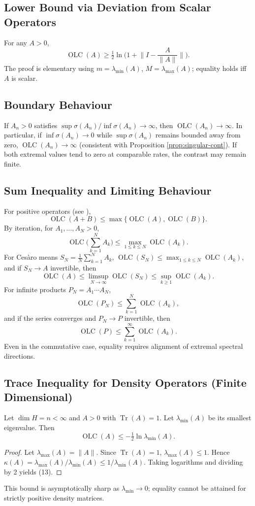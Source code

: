 \documentclass{article}
\theoremstyle{remark}
\providecommand{\QLC}{\operatorname{OLC}}
\begin{document}
\subsection{Lower Bound via Deviation from Scalar Operators}
For any $A>0$,
\[
\QLC(A) \ge \tfrac12\ln\Big(1+\Big\|I-\frac{A}{\|A\|}\Big\|\Big). \tag{7}
\]
The proof is elementary using $m=\lambda_{\min}(A)$, $M=\lambda_{\max}(A)$; equality holds iff $A$ is scalar.

\subsection{Boundary Behaviour}
If $A_n>0$ satisfies $\sup\sigma(A_n)/\inf\sigma(A_n)\to\infty$, then $\QLC(A_n)\to\infty$. In particular, if $\inf\sigma(A_n)\to0$ while $\sup\sigma(A_n)$ remains bounded away from zero, $\QLC(A_n)\to\infty$ (consistent with Proposition \ref{prop:singular-cont}). If both extremal values tend to zero at comparable rates, the contrast may remain finite.

\subsection{Sum Inequality and Limiting Behaviour}
For positive operators (see \cite{abed2024}),
\[
\QLC(A+B) \le \max\{\QLC(A),\QLC(B)\}. \tag{8}
\]
By iteration, for $A_1,\dots,A_N>0$,
\[
\QLC\Big(\sum_{k=1}^N A_k\Big) \le \max_{1\le k\le N}\QLC(A_k). \tag{9}
\]
For Ces\`aro means $S_N=\tfrac1N\sum_{k=1}^N A_k$, $\QLC(S_N)\le\max_{1\le k\le N}\QLC(A_k)$, and if $S_N\to A$ invertible, then
\[
\QLC(A) \le \limsup_{N\to\infty}\QLC(S_N) \le \sup_{k\ge1}\QLC(A_k). \tag{10}
\]
For infinite products $P_N=A_1\cdots A_N$,
\[
\QLC(P_N) \le \sum_{k=1}^N \QLC(A_k), \tag{11}
\]
and if the series converges and $P_N\to P$ invertible, then
\[
\QLC(P) \le \sum_{k=1}^\infty \QLC(A_k). \tag{12}
\]
Even in the commutative case, equality requires alignment of extremal spectral directions.

\subsection{Trace Inequality for Density Operators (Finite Dimensional)}
Let $\dim H=n<\infty$ and $A>0$ with $\operatorname{Tr}(A)=1$. Let $\lambda_{\min}(A)$ be its smallest eigenvalue. Then
\[
\QLC(A) \le -\tfrac12\ln\lambda_{\min}(A). \tag{13}
\]
\begin{proof}
Let $\lambda_{\max}(A)=\|A\|$. Since $\operatorname{Tr}(A)=1$, $\lambda_{\max}(A)\le1$. Hence $\kappa(A)=\lambda_{\max}(A)/\lambda_{\min}(A)\le1/\lambda_{\min}(A)$. Taking logarithms and dividing by 2 yields (13).
\end{proof}
This bound is asymptotically sharp as $\lambda_{\min}\to0$; equality cannot be attained for strictly positive density matrices.
\end{document}
